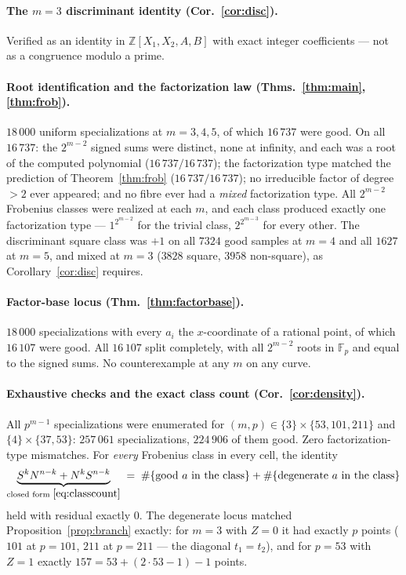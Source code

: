 \documentclass[11pt,a4paper]{article}
\theoremstyle{plain}
\theoremstyle{definition}
\newcommand{\FF}{\mathbb{F}}
\newcommand{\ZZ}{\mathbb{Z}}
\begin{document}
\paragraph{The $m=3$ discriminant identity (Cor.~\ref{cor:disc}).}
Verified as an identity in $\ZZ[X_1,X_2,A,B]$ with exact integer coefficients ---
not as a congruence modulo a prime.

\paragraph{Root identification and the factorization law
(Thms.~\ref{thm:main}, \ref{thm:frob}).}
$18\,000$ uniform specializations at $m = 3,4,5$, of which $16\,737$ were good.
On all $16\,737$: the $2^{m-2}$ signed sums were distinct, none at infinity, and
each was a root of the computed polynomial ($16\,737/16\,737$); the factorization
type matched the prediction of Theorem~\ref{thm:frob} ($16\,737/16\,737$); no
irreducible factor of degree $>2$ ever appeared; and no fibre ever had a
\emph{mixed} factorization type. All $2^{m-2}$ Frobenius classes were realized at
each $m$, and each class produced exactly one factorization type ---
$1^{2^{m-2}}$ for the trivial class, $2^{2^{m-3}}$ for every other. The
discriminant square class was $+1$ on all $7324$ good samples at $m=4$ and all
$1627$ at $m = 5$, and mixed at $m = 3$ ($3828$ square, $3958$ non-square), as
Corollary~\ref{cor:disc} requires.

\paragraph{Factor-base locus (Thm.~\ref{thm:factorbase}).}
$18\,000$ specializations with every $a_i$ the $x$-coordinate of a rational
point, of which $16\,107$ were good. All $16\,107$ split completely, with all
$2^{m-2}$ roots in $\FF_p$ and equal to the signed sums. No counterexample at any
$m$ on any curve.

\paragraph{Exhaustive checks and the exact class count
(Cor.~\ref{cor:density}).}
All $p^{m-1}$ specializations were enumerated for $(m,p) \in \{3\}\times\{53,101,211\}$
and $\{4\}\times\{37,53\}$: $257\,061$ specializations, $224\,906$ of them good.
Zero factorization-type mismatches. For \emph{every} Frobenius class in every
cell, the identity
\[
  \underbrace{S^k N^{n-k} + N^k S^{n-k}}_{\text{closed form } \eqref{eq:classcount}}
  \;=\; \#\{\text{good } a \text{ in the class}\} +
        \#\{\text{degenerate } a \text{ in the class}\}
\]
held with residual exactly $0$. The degenerate locus matched
Proposition~\ref{prop:branch} exactly: for $m=3$ with $Z = 0$ it had exactly $p$
points ($101$ at $p=101$, $211$ at $p=211$ --- the diagonal $t_1 = t_2$), and for
$p = 53$ with $Z = 1$ exactly $157 = 53 + (2\cdot 53 - 1) - 1$ points.
\end{document}
